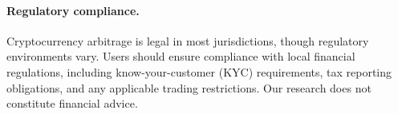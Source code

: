 \paragraph{Regulatory compliance.}
Cryptocurrency arbitrage is legal in most jurisdictions, though regulatory environments vary. Users should ensure compliance with local financial regulations, including know-your-customer (KYC) requirements, tax reporting obligations, and any applicable trading restrictions. Our research does not constitute financial advice.

